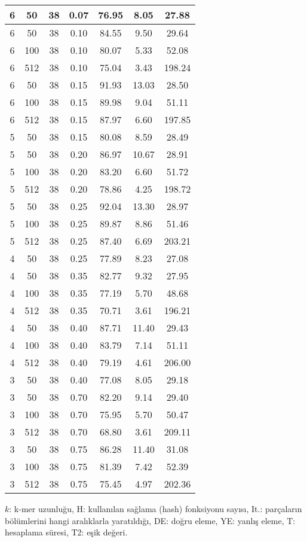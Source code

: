 \begin{table}
{\begin{tabular}{ | c | c | c | c | c | c | c |}
6 & 50 & 38 & 0.07 & 76.95 & 8.05 & 27.88 \\ \hline
6 & 50 & 38 & 0.10 & 84.55 & 9.50 & 29.64 \\ \hline
6 & 100 & 38 & 0.10 & 80.07 & 5.33 & 52.08 \\ \hline
6 & 512 & 38 & 0.10 & 75.04 & 3.43 & 198.24 \\ \hline
6 & 50 & 38 & 0.15 & 91.93 & 13.03 & 28.50 \\ \hline
6 & 100 & 38 & 0.15 & 89.98 & 9.04 & 51.11 \\ \hline
6 & 512 & 38 & 0.15 & 87.97 & 6.60 & 197.85 \\ \hline
5 & 50 & 38 & 0.15 & 80.08 & 8.59 & 28.49 \\ \hline
5 & 50 & 38 & 0.20 & 86.97 & 10.67 & 28.91 \\ \hline
5 & 100 & 38 & 0.20 & 83.20 & 6.60 & 51.72 \\ \hline
5 & 512 & 38 & 0.20 & 78.86 & 4.25 & 198.72 \\ \hline
5 & 50 & 38 & 0.25 & 92.04 & 13.30 & 28.97 \\ \hline
5 & 100 & 38 & 0.25 & 89.87 & 8.86 & 51.46 \\ \hline
5 & 512 & 38 & 0.25 & 87.40 & 6.69 & 203.21 \\ \hline
4 & 50 & 38 & 0.25 & 77.89 & 8.23 & 27.08 \\ \hline
4 & 50 & 38 & 0.35 & 82.77 & 9.32 & 27.95 \\ \hline
4 & 100 & 38 & 0.35 & 77.19 & 5.70 & 48.68 \\ \hline
4 & 512 & 38 & 0.35 & 70.71 & 3.61 & 196.21 \\ \hline
4 & 50 & 38 & 0.40 & 87.71 & 11.40 & 29.43 \\ \hline
4 & 100 & 38 & 0.40 & 83.79 & 7.14 & 51.11 \\ \hline
4 & 512 & 38 & 0.40 & 79.19 & 4.61 & 206.00 \\ \hline
3 & 50 & 38 & 0.40 & 77.08 & 8.05 & 29.18 \\ \hline
3 & 50 & 38 & 0.70 & 82.20 & 9.14 & 29.40 \\ \hline
3 & 100 & 38 & 0.70 & 75.95 & 5.70 & 50.47 \\ \hline
3 & 512 & 38 & 0.70 & 68.80 & 3.61 & 209.11 \\ \hline
3 & 50 & 38 & 0.75 & 86.28 & 11.40 & 31.08 \\ \hline
3 & 100 & 38 & 0.75 & 81.39 & 7.42 & 52.39 \\ \hline
3 & 512 & 38 & 0.75 & 75.45 & 4.97 & 202.36 \\ \hline
\end{tabular}
}
$k$: k-mer uzunluğu, H: kullanılan sağlama (hash) fonksiyonu sayısı, It.: parçaların bölümlerini hangi aralıklarla yaratıldığı,
DE: doğru eleme, YE: yanlış eleme, T: hesaplama süresi, T2: eşik değeri.
\end{table}

